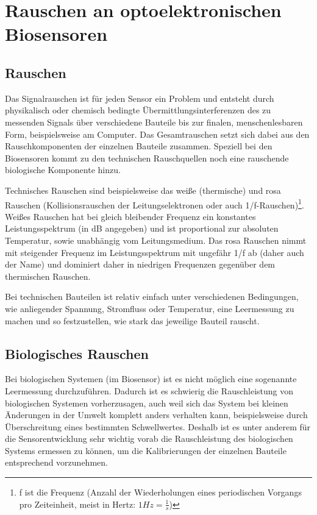 \chapter{Rauschen an optoelektronischen Biosensoren}

\section{Rauschen}
Das Signalrauschen ist für jeden Sensor ein Problem und entsteht durch physikalisch oder chemisch bedingte Übermittlungsinterferenzen des zu messenden Signals über verschiedene Bauteile bis zur finalen, menschenlesbaren Form, beispielsweise am Computer. Das Gesamtrauschen setzt sich dabei aus den Rauschkomponenten der einzelnen Bauteile zusammen.\newline
Speziell bei den Biosensoren kommt zu den technischen Rauschquellen noch eine rauschende biologische Komponente hinzu.\par

Technisches Rauschen sind beispielsweise das weiße (thermische) und rosa Rauschen (Kollisionsrauschen der Leitungselektronen oder auch 1/f-Rauschen)\footnote{f ist die Frequenz (Anzahl der Wiederholungen eines periodischen Vorgangs pro Zeiteinheit, meist in Hertz: $1Hz = \frac{1}{s}$)}. Weißes Rauschen hat bei gleich bleibender Frequenz ein konstantes Leistungsspektrum (in dB angegeben) und ist proportional zur absoluten Temperatur, sowie unabhängig vom Leitungsmedium. Das rosa Rauschen nimmt mit steigender Frequenz im Leistungsspektrum mit ungefähr 1/f ab (daher auch der Name) und dominiert daher in niedrigen Frequenzen gegenüber dem thermischen Rauschen.\par

Bei technischen Bauteilen ist relativ einfach unter verschiedenen Bedingungen, wie anliegender Spannung, Stromfluss oder Temperatur, eine Leermessung zu machen und so festzustellen, wie stark das jeweilige Bauteil rauscht.

\section{Biologisches Rauschen}
Bei biologischen Systemen (im Biosensor) ist es nicht möglich eine sogenannte Leermessung durchzuführen. Dadurch ist es schwierig die Rauschleistung von biologischen Systemen vorherzusagen, auch weil sich das System bei kleinen Änderungen in der Umwelt komplett anders verhalten kann, beispielsweise durch Überschreitung eines bestimmten Schwellwertes. Deshalb ist es unter anderem für die Sensorentwicklung sehr wichtig vorab die Rauschleistung des biologischen Systems ermessen zu können, um die Kalibrierungen der einzelnen Bauteile entsprechend vorzunehmen.\par

